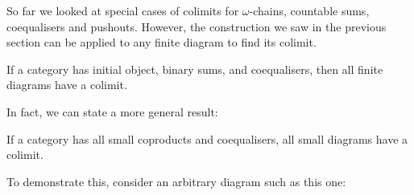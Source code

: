 So far we looked at special cases of colimits for $\omega$-chains, countable
sums, coequalisers and pushouts. However, the construction we saw in the
previous section can be applied to any finite diagram to find its colimit.

\begin{proposition}
If a category has initial object, binary sums, and coequalisers, then all
finite diagrams have a colimit.
\end{proposition}

In fact, we can state a more general result:

\begin{proposition}
If a category has all small coproducts and coequalisers, all small diagrams
have a colimit.
\end{proposition}

To demonstrate this, consider an arbitrary diagram such as this one:

\begin{center}
\end{center}

